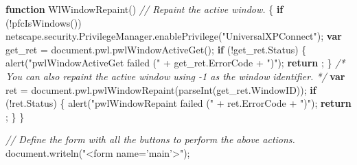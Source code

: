 \documentclass[]{article}
\newenvironment{Shaded}{}{}
\newcommand{\KeywordTok}[1]{\textcolor[rgb]{0.00,0.44,0.13}{\textbf{{#1}}}}
\newcommand{\StringTok}[1]{\textcolor[rgb]{0.25,0.44,0.63}{{#1}}}
\newcommand{\CommentTok}[1]{\textcolor[rgb]{0.38,0.63,0.69}{\textit{{#1}}}}
\newcommand{\OtherTok}[1]{\textcolor[rgb]{0.00,0.44,0.13}{{#1}}}
\newcommand{\FunctionTok}[1]{\textcolor[rgb]{0.02,0.16,0.49}{{#1}}}
\newcommand{\NormalTok}[1]{{#1}}
\begin{document}
\begin{Shaded}
\begin{Highlighting}[]
\KeywordTok{function} \FunctionTok{WlWindowRepaint}\NormalTok{()}
\CommentTok{//  Repaint the active window.}
\NormalTok{\{}
  \KeywordTok{if} \NormalTok{(!}\FunctionTok{pfcIsWindows}\NormalTok{())}
    \OtherTok{netscape}\NormalTok{.}\OtherTok{security}\NormalTok{.}\OtherTok{PrivilegeManager}\NormalTok{.}\FunctionTok{enablePrivilege}\NormalTok{(}\StringTok{"UniversalXPConnect"}\NormalTok{);}
  \KeywordTok{var} \NormalTok{get_ret = }\OtherTok{document}\NormalTok{.}\OtherTok{pwl}\NormalTok{.}\FunctionTok{pwlWindowActiveGet}\NormalTok{();}
  \KeywordTok{if} \NormalTok{(!}\OtherTok{get_ret}\NormalTok{.}\FunctionTok{Status}\NormalTok{)}
    \NormalTok{\{}
      \FunctionTok{alert}\NormalTok{(}\StringTok{"pwlWindowActiveGet failed ("} \NormalTok{+ }\OtherTok{get_ret}\NormalTok{.}\FunctionTok{ErrorCode} \NormalTok{+ }\StringTok{")"}\NormalTok{);}
      \KeywordTok{return} \NormalTok{;}
    \NormalTok{\}}
  \CommentTok{/* You can also repaint the active window using -1 as the window}
\CommentTok{     identifier. */}
  \KeywordTok{var} \NormalTok{ret = }\OtherTok{document}\NormalTok{.}\OtherTok{pwl}\NormalTok{.}\FunctionTok{pwlWindowRepaint}\NormalTok{(}\FunctionTok{parseInt}\NormalTok{(}\OtherTok{get_ret}\NormalTok{.}\FunctionTok{WindowID}\NormalTok{));}
  \KeywordTok{if} \NormalTok{(!}\OtherTok{ret}\NormalTok{.}\FunctionTok{Status}\NormalTok{)}
    \NormalTok{\{}
      \FunctionTok{alert}\NormalTok{(}\StringTok{"pwlWindowRepaint failed ("} \NormalTok{+ }\OtherTok{ret}\NormalTok{.}\FunctionTok{ErrorCode} \NormalTok{+ }\StringTok{")"}\NormalTok{);}
      \KeywordTok{return} \NormalTok{;}
    \NormalTok{\}}
\NormalTok{\}}

\CommentTok{// Define the form with all the buttons to perform the above actions.}
\OtherTok{document}\NormalTok{.}\FunctionTok{writeln}\NormalTok{(}\StringTok{"<form name='main'>"}\NormalTok{);}


\end{Highlighting}
\end{Shaded}
\end{document}
